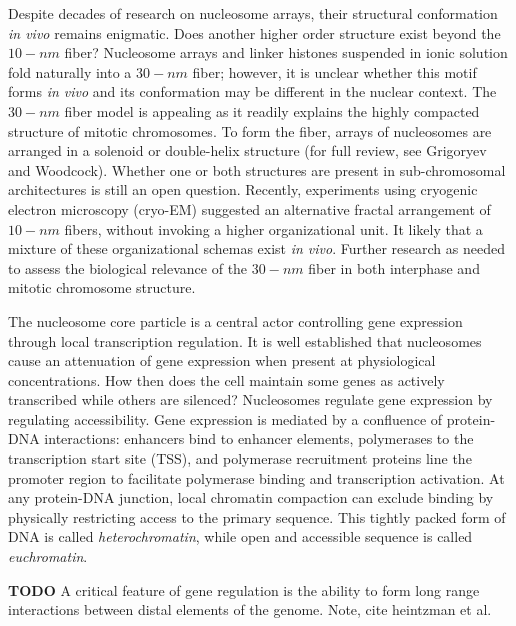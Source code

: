 Despite decades of research on nucleosome arrays, their structural conformation
\textit{in vivo} remains enigmatic.   Does another higher order structure exist
beyond the $10-nm$ fiber?  Nucleosome arrays and linker histones suspended in ionic
solution fold naturally into a $30-nm$ fiber\cite{tremethick2007}; however, it
is unclear whether this motif forms \textit{in vivo} and its conformation may
be different in the nuclear context\cite{bian2012}.  The $30-nm$ fiber model
is appealing as it readily explains the highly compacted structure of mitotic
chromosomes.  To form the fiber, arrays of nucleosomes are arranged in a
solenoid or double-helix structure (for full review, see Grigoryev and
Woodcock\cite{grigoryev2012}).  Whether one or both structures are present in
sub-chromosomal architectures is still an open question\cite{song2014}.  Recently,
experiments using cryogenic electron microscopy (cryo-EM) suggested an
alternative fractal arrangement of $10-nm$ fibers, without invoking a higher
organizational unit\cite{nishino2012}\cite{hansen2012}.  It likely that a
mixture of these organizational schemas exist \textit{in vivo}.  Further
research as needed to assess the biological relevance of the $30-nm$ fiber in
both interphase and mitotic chromosome structure.

The nucleosome core particle is a central actor controlling gene expression
through local transcription regulation.  It is well established that nucleosomes
cause an attenuation of gene expression when present at physiological
concentrations\cite{brown1984}\cite{lorch1987}\cite{laybourn1991}\cite{juan1994}.
How then does the cell maintain some genes as actively transcribed while others
are silenced?  Nucleosomes regulate gene expression by regulating accessibility.
Gene expression is mediated by a confluence of protein-DNA interactions:
enhancers bind to enhancer elements, polymerases to the transcription start
site (TSS), and polymerase recruitment proteins line the promoter region to
facilitate polymerase binding and transcription activation\cite{cox2008}.  At
any protein-DNA junction, local chromatin compaction can exclude binding by
physically restricting access to the primary sequence.  This tightly packed
form of DNA is called \textit{heterochromatin}, while open and accessible
sequence is called \textit{euchromatin}.

\textbf{TODO}
A critical feature of gene regulation is the ability to form long range
interactions between distal elements of the genome.  Note, cite heintzman et al.

